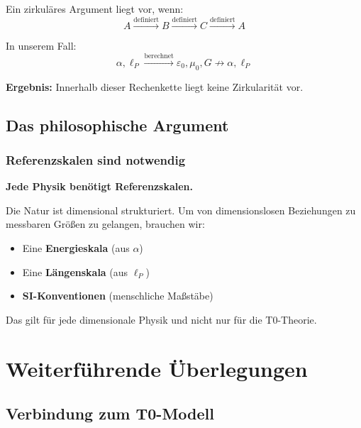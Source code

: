 	Ein zirkuläres Argument liegt vor, wenn:
	\begin{equation}
		A \xrightarrow{\text{definiert}} B \xrightarrow{\text{definiert}} C \xrightarrow{\text{definiert}} A
	\end{equation}
	
	In unserem Fall:
	\begin{equation}
		\alpha, \ell_P \xrightarrow{\text{berechnet}} \varepsilon_0, \mu_0, G \not\rightarrow \alpha, \ell_P
	\end{equation}
	
	\textbf{Ergebnis:} Innerhalb dieser Rechenkette liegt keine Zirkularität vor.
	
	\subsection{Das philosophische Argument}
	
	\subsubsection{Referenzskalen sind notwendig}
	
	\begin{tcolorbox}[colback=blue!5!white,colframe=blue!75!black,title=Referenzskalen]
		\textbf{Jede Physik benötigt Referenzskalen.}
		
		Die Natur ist dimensional strukturiert. Um von dimensionslosen Beziehungen zu messbaren Größ{}en zu gelangen, brauchen wir:
		\begin{itemize}
			\item Eine \textbf{Energieskala} (aus $\alpha$)
			\item Eine \textbf{Längenskala} (aus $\ell_P$) 
			\item \textbf{SI-Konventionen} (menschliche Maß{}stäbe)
		\end{itemize}
		
		Das gilt für jede dimensionale Physik und nicht nur für die T0-Theorie.
	\end{tcolorbox}
	
	\section{Weiterführende Überlegungen}
	
	\subsection{Verbindung zum T0-Modell}
	
